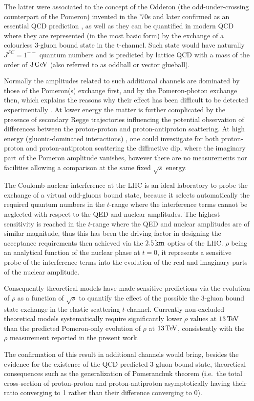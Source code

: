 The latter were associated to the concept of the Odderon (the odd-under-crossing counterpart of the Pomeron) invented in the '70s \cite{nicolescu-1973} and later confirmed as an essential QCD prediction \cite{lipatov-1986}, as well as they can be quantified in modern QCD \cite{durham-2015-review} where they are represented (in the most basic form) by the exchange of a colourless 3-gluon bound state in the t-channel. Such state would have naturally $J^{PC}=1^{--}$ quantum numbers and is predicted by lattice QCD with a mass of the order of $3\,{\rm GeV}$ (also referred to as oddball or vector glueball).

Normally the amplitudes related to such additional channels are dominated by those of the Pomeron(s) exchange first, and by the Pomeron-photon exchange then, which explains the reasons why their effect has been difficult to be detected experimentally%
. At lower energy %
the matter is further complicated by the presence of secondary Regge trajectories influencing the potential observation of differences between the proton-proton and proton-antiproton scattering. At high energy (gluonic-dominated interactions)%
, one could investigate for both proton-proton and proton-antiproton scattering the diffractive dip, where the imaginary part of the Pomeron amplitude vanishes, however there are no measurements nor facilities allowing a comparison at the same fixed $\sqrt s$ energy.

The Coulomb-nuclear interference at the LHC is an ideal laboratory to probe the exchange of a virtual odd-gluons bound state, because it selects automatically the required quantum numbers in the $t$-range where the interference terms cannot be neglected with respect to the QED and nuclear amplitudes. The highest sensitivity is reached in the $t$-range where the QED and nuclear amplitudes are of similar magnitude, thus this has been the driving factor in designing the acceptance requirements then achieved via the $2.5\,{\rm km}$ optics of the LHC. $\rho$ being an analytical function of the nuclear phase at $t=0$, it represents a sensitive probe of the interference terms into the evolution of the real and imaginary parts of the nuclear amplitude.

Consequently theoretical models have made sensitive predictions via the evolution of $\rho$ as a function of $\sqrt s$ to quantify the effect of the possible the 3-gluon bound state exchange in the elastic scattering $t$-channel. Currently non-excluded theoretical models systematically require significantly lower $\rho$ values at $13\,{\rm TeV}$ than the predicted Pomeron-only evolution of $\rho$ at $13\,{\rm TeV}$, consistently with the $\rho$ measurement reported in the present work.

The confirmation of this result in additional channels would bring, besides the evidence for the existence of the QCD predicted 3-gluon bound state, theoretical consequences such as the generalization of Pomeranchuk theorem (i.e.~the total cross-section of proton-proton and proton-antiproton asymptotically having their ratio converging to 1 rather than their difference converging to 0).
